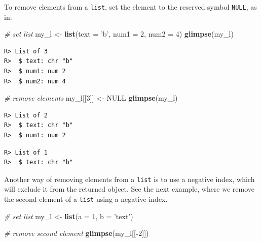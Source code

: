 \documentclass[
  12pt,
]{book}
\newenvironment{Shaded}{\begin{snugshade}}{\end{snugshade}}
\newcommand{\CommentTok}[1]{\textcolor[rgb]{0.37,0.37,0.37}{\textit{#1}}}
\newcommand{\DataTypeTok}[1]{\textcolor[rgb]{0.27,0.27,0.27}{#1}}
\newcommand{\DecValTok}[1]{\textcolor[rgb]{0.06,0.06,0.06}{#1}}
\newcommand{\KeywordTok}[1]{\textcolor[rgb]{0.27,0.27,0.27}{\textbf{#1}}}
\newcommand{\NormalTok}[1]{#1}
\newcommand{\OperatorTok}[1]{\textcolor[rgb]{0.43,0.43,0.43}{\textbf{#1}}}
\newcommand{\OtherTok}[1]{\textcolor[rgb]{0.37,0.37,0.37}{#1}}
\newcommand{\StringTok}[1]{\textcolor[rgb]{0.5,0.5,0.5}{#1}}
\begin{document}
To remove elements from a \texttt{list}, set the element to the reserved symbol \texttt{NULL}, as in: 

\begin{Shaded}
\begin{Highlighting}[]
\CommentTok{# set list}
\NormalTok{my_l <-}\StringTok{ }\KeywordTok{list}\NormalTok{(}\DataTypeTok{text =} \StringTok{'b'}\NormalTok{, }\DataTypeTok{num1 =} \DecValTok{2}\NormalTok{, }\DataTypeTok{num2 =} \DecValTok{4}\NormalTok{)}
\KeywordTok{glimpse}\NormalTok{(my_l)}
\end{Highlighting}
\end{Shaded}

\begin{verbatim}
R> List of 3
R>  $ text: chr "b"
R>  $ num1: num 2
R>  $ num2: num 4
\end{verbatim}

\begin{Shaded}
\begin{Highlighting}[]
\CommentTok{# remove elements}
\NormalTok{my_l[[}\DecValTok{3}\NormalTok{]] <-}\StringTok{ }\OtherTok{NULL}
\KeywordTok{glimpse}\NormalTok{(my_l)}
\end{Highlighting}
\end{Shaded}

\begin{verbatim}
R> List of 2
R>  $ text: chr "b"
R>  $ num1: num 2
\end{verbatim}

\begin{Shaded}
\end{Shaded}

\begin{verbatim}
R> List of 1
R>  $ text: chr "b"
\end{verbatim}

Another way of removing elements from a \texttt{list} is to use a negative index, which will exclude it from the returned object. See the next example, where we remove the second element of a \texttt{list} using a negative index.

\begin{Shaded}
\begin{Highlighting}[]
\CommentTok{# set list}
\NormalTok{my_l <-}\StringTok{ }\KeywordTok{list}\NormalTok{(}\DataTypeTok{a =} \DecValTok{1}\NormalTok{, }
             \DataTypeTok{b =} \StringTok{'text'}\NormalTok{)}

\CommentTok{# remove second element}
\KeywordTok{glimpse}\NormalTok{(my_l[[}\OperatorTok{-}\DecValTok{2}\NormalTok{]])}
\end{Highlighting}
\end{Shaded}
\end{document}
